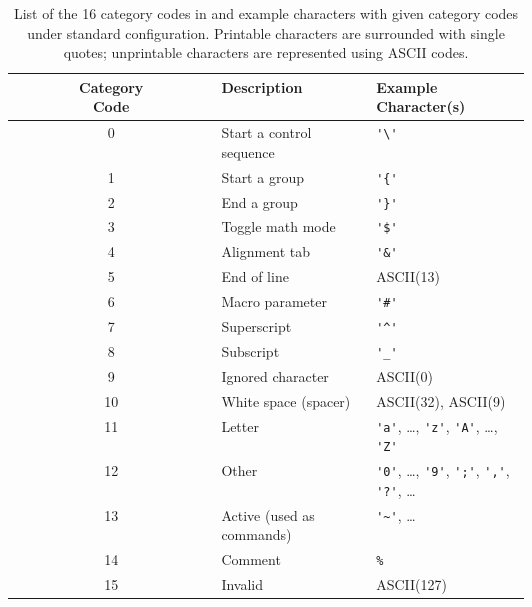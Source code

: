 \documentclass{ltugboat}
\begin{document}
\begin{table}[tb]
  \centering
  \footnotesize
  \begin{tabular}{|c|>{\centering\arraybackslash}m{0.3\linewidth}|>{\centering\arraybackslash}m{0.3\linewidth}|}
    \hline
    \makecell{Category\\Code} & Description & \makecell{Example\\Character(s)} \\ \hline
    0 & Start a control sequence  & \verb|'\'| \\ \hline
    1 & Start a group & \verb|'{'| \\ \hline
    2 & End a group & \verb|'}'| \\ \hline
    3 & Toggle math mode & \verb|'$'| \\ \hline
    4 & Alignment tab & \verb|'&'| \\ \hline
    5 & End of line & ASCII(13) \\ \hline
    6 & Macro parameter & \verb|'#'| \\ \hline
    7 & Superscript & \verb|'^'| \\ \hline
    8 & Subscript & \verb|'_'| \\ \hline
    9 & Ignored character & ASCII(0) \\ \hline
    10 & White space (spacer) & ASCII(32), ASCII(9) \\ \hline
    11 & Letter & \verb|'a'|, \ldots, \verb|'z'|, \verb|'A'|, \ldots, \verb|'Z'|\\ \hline
    12 & Other & \verb|'0'|, \ldots, \verb|'9'|, \verb|';'|, \verb|','|, \verb|'?'|, \ldots\\ \hline
    13 & Active (used as commands) & \verb|'~'|, \ldots\\ \hline
    14 & Comment & \verb|%| \\ \hline
    15 & Invalid & ASCII(127) \\ \hline
  \end{tabular}
  \caption{List of the 16 category codes in \LT{} and example characters with given category codes under standard \LT{} configuration. Printable characters are surrounded with single quotes; unprintable characters are represented using ASCII codes.}
  \label{tab:cat-code}
\end{table}
\end{document}
